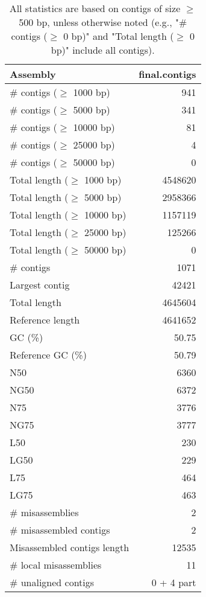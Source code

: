\documentclass[12pt,a4paper]{article}
\begin{document}
\begin{table}[ht]
\begin{center}
\caption{All statistics are based on contigs of size $\geq$ 500 bp, unless otherwise noted (e.g., "\# contigs ($\geq$ 0 bp)" and "Total length ($\geq$ 0 bp)" include all contigs).}
\begin{tabular}{|l*{1}{|r}|}
\hline
Assembly & final.contigs \\ \hline
\# contigs ($\geq$ 1000 bp) & 941 \\ \hline
\# contigs ($\geq$ 5000 bp) & 341 \\ \hline
\# contigs ($\geq$ 10000 bp) & 81 \\ \hline
\# contigs ($\geq$ 25000 bp) & 4 \\ \hline
\# contigs ($\geq$ 50000 bp) & 0 \\ \hline
Total length ($\geq$ 1000 bp) & 4548620 \\ \hline
Total length ($\geq$ 5000 bp) & 2958366 \\ \hline
Total length ($\geq$ 10000 bp) & 1157119 \\ \hline
Total length ($\geq$ 25000 bp) & 125266 \\ \hline
Total length ($\geq$ 50000 bp) & 0 \\ \hline
\# contigs & 1071 \\ \hline
Largest contig & 42421 \\ \hline
Total length & 4645604 \\ \hline
Reference length & 4641652 \\ \hline
GC (\%) & 50.75 \\ \hline
Reference GC (\%) & 50.79 \\ \hline
N50 & 6360 \\ \hline
NG50 & 6372 \\ \hline
N75 & 3776 \\ \hline
NG75 & 3777 \\ \hline
L50 & 230 \\ \hline
LG50 & 229 \\ \hline
L75 & 464 \\ \hline
LG75 & 463 \\ \hline
\# misassemblies & 2 \\ \hline
\# misassembled contigs & 2 \\ \hline
Misassembled contigs length & 12535 \\ \hline
\# local misassemblies & 11 \\ \hline
\# unaligned contigs & 0 + 4 part \\ \hline

\end{tabular}
\end{center}
\end{table}
\end{document}
